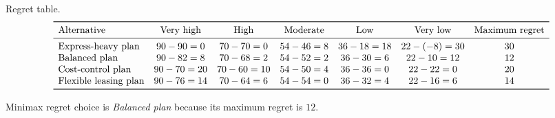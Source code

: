 \begin{ExamProblems}
		Regret table.
		\[
		\begin{array}{lcccccc}
			\toprule
			\text{Alternative} & \text{Very high} & \text{High} & \text{Moderate} & \text{Low} & \text{Very low} & \text{Maximum regret}\\
			\midrule
			\text{Express-heavy plan} & 90-90=0 & 70-70=0 & 54-46=8 & 36-18=18 & 22-(-8)=30 & 30\\
			\text{Balanced plan} & 90-82=8 & 70-68=2 & 54-52=2 & 36-30=6 & 22-10=12 & 12\\
			\text{Cost-control plan} & 90-70=20 & 70-60=10 & 54-50=4 & 36-36=0 & 22-22=0 & 20\\
			\text{Flexible leasing plan} & 90-76=14 & 70-64=6 & 54-54=0 & 36-32=4 & 22-16=6 & 14\\
			\bottomrule
		\end{array}
		\]

		Minimax regret choice is \emph{Balanced plan} because its maximum regret is $12$.
	\end{ExamProblems}

